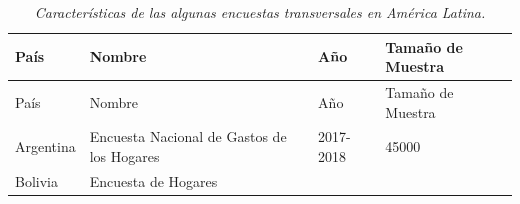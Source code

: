 \begin{longtable}[]{@{}llll@{}}
\caption{\emph{Características de las algunas encuestas transversales en América Latina.}}\tabularnewline
\toprule
\begin{minipage}[b]{0.17\columnwidth}\raggedright
País\strut
\end{minipage} & \begin{minipage}[b]{0.50\columnwidth}\raggedright
Nombre\strut
\end{minipage} & \begin{minipage}[b]{0.08\columnwidth}\raggedright
Año\strut
\end{minipage} & \begin{minipage}[b]{0.14\columnwidth}\raggedright
Tamaño de Muestra\strut
\end{minipage}\tabularnewline
\midrule
\endfirsthead
\toprule
\begin{minipage}[b]{0.17\columnwidth}\raggedright
País\strut
\end{minipage} & \begin{minipage}[b]{0.50\columnwidth}\raggedright
Nombre\strut
\end{minipage} & \begin{minipage}[b]{0.08\columnwidth}\raggedright
Año\strut
\end{minipage} & \begin{minipage}[b]{0.14\columnwidth}\raggedright
Tamaño de Muestra\strut
\end{minipage}\tabularnewline
\midrule
\endhead
\begin{minipage}[t]{0.17\columnwidth}\raggedright
Argentina\strut
\end{minipage} & \begin{minipage}[t]{0.50\columnwidth}\raggedright
Encuesta Nacional de Gastos de los Hogares\strut
\end{minipage} & \begin{minipage}[t]{0.08\columnwidth}\raggedright
2017-2018\strut
\end{minipage} & \begin{minipage}[t]{0.14\columnwidth}\raggedright
45000\strut
\end{minipage}\tabularnewline
\begin{minipage}[t]{0.17\columnwidth}\raggedright
Bolivia\strut
\end{minipage} & \begin{minipage}[t]{0.50\columnwidth}\raggedright
Encuesta de Hogares\strut
\end{minipage} & \begin{minipage}[t]{0.08\columnwidth}\raggedright

\end{minipage}
\end{longtable}
